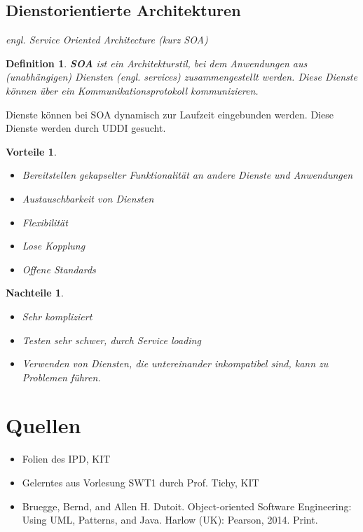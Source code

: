 \documentclass[a4paper]{article}
\theoremstyle{break}
\newtheorem{defi}{Definition}[section]
\newtheorem{why}{Vorteile}[section]
\newtheorem{whynot}{Nachteile}[section]
\begin{document}
\subsection{Dienstorientierte Architekturen}
\textit{engl. Service Oriented Architecture (kurz SOA)}
\begin{defi}
	\textbf{SOA} ist ein Architekturstil, bei dem Anwendungen aus (unabhängigen) Diensten (engl. services) zusammengestellt werden. Diese Dienste können über ein Kommunikationsprotokoll kommunizieren.
\end{defi}
Dienste können bei SOA dynamisch zur Laufzeit eingebunden werden. Diese Dienste werden durch UDDI gesucht. 
\begin{why}
	\begin{itemize}
		\item Bereitstellen gekapselter Funktionalität an andere Dienste und Anwendungen
		\item Austauschbarkeit von Diensten
		\item Flexibilität
		\item Lose Kopplung
		\item Offene Standards
	\end{itemize}
\end{why}
\begin{whynot}
	\begin{itemize}
		\item Sehr kompliziert
		\item Testen sehr schwer, durch Service loading
		\item Verwenden von Diensten, die untereinander inkompatibel sind, kann zu Problemen führen.
	\end{itemize}
\end{whynot}
\newpage
\appendix
\section{Quellen}
\begin{itemize}
	\item Folien des IPD, KIT
	\item Gelerntes aus Vorlesung SWT1 durch Prof. Tichy, KIT
	\item Bruegge, Bernd, and Allen H. Dutoit. Object-oriented Software Engineering: Using UML, Patterns, and Java. Harlow (UK): Pearson, 2014. Print. 
\end{itemize}
\end{document}
